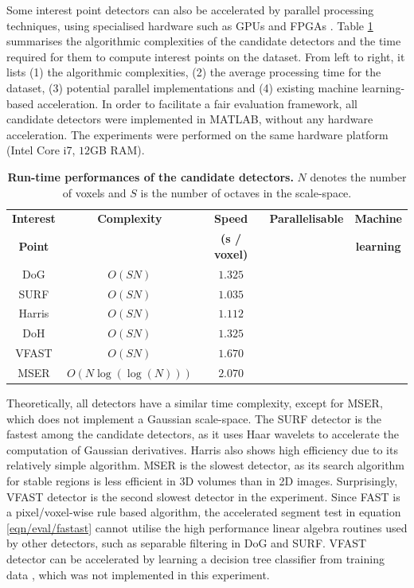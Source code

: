 Some interest point detectors can also be accelerated by parallel processing techniques, using specialised hardware such as GPUs and FPGAs \cite{Sinha2006, Cornelis2008, Teixeira2008, Bhatia2007, Dohi2011, Kristensen2007}. Table \ref{tab/eval/speedtable} summarises the algorithmic complexities of the candidate detectors and the time required for them to compute interest points on the \meshset dataset. From left to right, it lists (1) the algorithmic complexities, (2) the average processing time for the \meshset dataset, (3) potential parallel implementations and (4) existing machine learning-based acceleration. 
In order to facilitate a fair evaluation framework, all candidate detectors were implemented in MATLAB, without any hardware acceleration. The experiments were performed on the same hardware platform (Intel Core i7, $12$GB RAM). 

\begin{table}
\centering
\begin{tabular}{|c|cccc|}
\hline
\textbf{Interest} & \textbf{Complexity} & \textbf{Speed} & \textbf{Parallelisable} & \textbf{Machine} \\
\textbf{Point} & & \textbf{(\bm{$\mu$}s / voxel)} & & \textbf{learning} 	\\ 	
\hline
DoG 		& $O(SN)$ 			& $1.325 $ 			& \checkmark \cite{Sinha2006} & \\
SURF 		& $O(SN)$ 			& $1.035 $ 			& \checkmark \cite{Cornelis2008} & \\
Harris 		& $O(SN)$ 			& $1.112 $ 			& \checkmark \cite{Teixeira2008} & \\
DoH			& $O(SN)$ 			& $1.325 $ 			& \checkmark \cite{Bhatia2007} \\
VFAST 		& $O(SN)$ 			& $1.670 $ 			& \checkmark \cite{Dohi2011} & \checkmark \cite{Rosten2010}\\
MSER 		& $O(N\log(\log(N)))$ 	& $2.070 $ 			& \checkmark \cite{Kristensen2007} &\\
\hline
\end{tabular}
\caption{\textbf{Run-time performances of the candidate detectors.} $N$ denotes the number of voxels and $S$ is the number of octaves in the scale-space.}
\label{tab/eval/speedtable}
\end{table}

Theoretically, all detectors have a similar time complexity, except for MSER, which does not implement a Gaussian scale-space. The SURF detector is the fastest among the candidate detectors, as it uses Haar wavelets to accelerate the computation of Gaussian derivatives. Harris also shows high efficiency due to its relatively simple algorithm. MSER is the slowest detector, as its search algorithm for stable regions is less efficient in 3D volumes than in 2D images. Surprisingly, VFAST detector is the second slowest detector in the experiment. Since FAST is a pixel/voxel-wise rule based algorithm, the accelerated segment test in equation \ref{eqn/eval/fastast} cannot utilise the high performance linear algebra routines used by other detectors, such as separable filtering in DoG and SURF. VFAST detector can be accelerated by learning a decision tree classifier from training data \cite{Rosten2010}, which was not implemented in this experiment.

